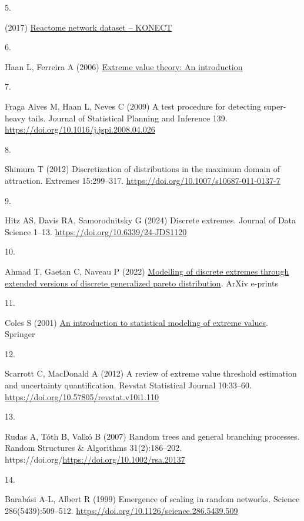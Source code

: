 \documentclass[
  10pt,
  a4paper,
]{scrreprt}
\newlength{\cslhangindent}
\newlength{\csllabelwidth}
\newlength{\cslentryspacingunit} %
\newenvironment{CSLReferences}[2] %
 {%
  \setlength{\parindent}{0pt}
  \ifodd #1
  \let\oldpar\par
  \def\par{\hangindent=\cslhangindent\oldpar}
  \fi
  \setlength{\parskip}{#2\cslentryspacingunit}
 }%
 {}
\newcommand{\CSLLeftMargin}[1]{\parbox[t]{\csllabelwidth}{#1}}
\newcommand{\CSLRightInline}[1]{\parbox[t]{\linewidth - \csllabelwidth}{#1}\break}
\theoremstyle{plain}
\theoremstyle{definition}
\theoremstyle{plain}
\theoremstyle{remark}
\begin{document}
{\begin{CSLReferences}{0}{0}
\leavevmode{}%
\CSLLeftMargin{5. }%
\CSLRightInline{(2017)
\href{http://konect.cc/networks/reactome}{Reactome network dataset --
{KONECT}}}

\leavevmode{}%
\CSLLeftMargin{6. }%
\CSLRightInline{Haan L, Ferreira A (2006)
\href{https://doi.org/10.1007/0-387-34471-3}{Extreme value theory: An
introduction}}

\leavevmode{}%
\CSLLeftMargin{7. }%
\CSLRightInline{Fraga Alves M, Haan L, Neves C (2009) A test procedure
for detecting super-heavy tails. Journal of Statistical Planning and
Inference 139. \url{https://doi.org/10.1016/j.jspi.2008.04.026}}

\leavevmode{}%
\CSLLeftMargin{8. }%
\CSLRightInline{Shimura T (2012) Discretization of distributions in the
maximum domain of attraction. Extremes 15:299--317.
\url{https://doi.org/10.1007/s10687-011-0137-7}}

\leavevmode{}%
\CSLLeftMargin{9. }%
\CSLRightInline{Hitz AS, Davis RA, Samorodnitsky G (2024) Discrete
extremes. Journal of Data Science 1--13.
\url{https://doi.org/10.6339/24-JDS1120}}

\leavevmode{}%
\CSLLeftMargin{10. }%
\CSLRightInline{Ahmad T, Gaetan C, Naveau P (2022)
\href{https://arxiv.org/abs/2210.15253}{Modelling of discrete extremes
through extended versions of discrete generalized pareto distribution}.
ArXiv e-prints}

\leavevmode{}%
\CSLLeftMargin{11. }%
\CSLRightInline{Coles S (2001)
\href{https://books.google.co.uk/books?id=2nugUEaKqFEC}{An introduction
to statistical modeling of extreme values}. Springer}

\leavevmode{}%
\CSLLeftMargin{12. }%
\CSLRightInline{Scarrott C, MacDonald A (2012) A review of extreme value
threshold estimation and uncertainty quantification. Revstat Statistical
Journal 10:33--60. \url{https://doi.org/10.57805/revstat.v10i1.110}}

\leavevmode{}%
\CSLLeftMargin{13. }%
\CSLRightInline{Rudas A, Tóth B, Valkó B (2007) Random trees and general
branching processes. Random Structures \& Algorithms 31(2):186--202.
https://doi.org/\url{https://doi.org/10.1002/rsa.20137}}

\leavevmode{}%
\CSLLeftMargin{14. }%
\CSLRightInline{Barabási A-L, Albert R (1999) Emergence of scaling in
random networks. Science 286(5439):509--512.
\url{https://doi.org/10.1126/science.286.5439.509}}


\end{CSLReferences}}
\end{document}
